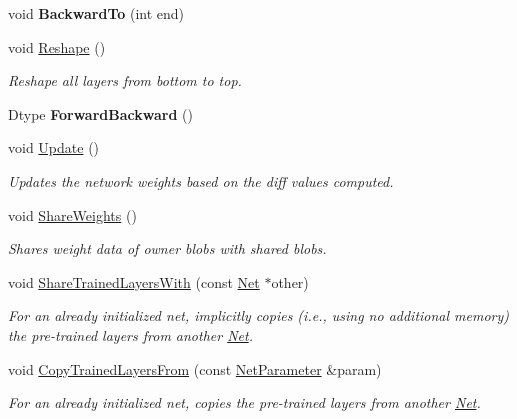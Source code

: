 \begin{DoxyCompactItemize}
void {\bfseries Backward\+To} (int end)
\item 
void \mbox{\hyperlink{classcaffe_1_1_net_a8417af82aa83be45d39aab735bdead1d}{Reshape}} ()
\begin{DoxyCompactList}\small\item\em Reshape all layers from bottom to top. \end{DoxyCompactList}\item 
\mbox{\label{classcaffe_1_1_net_a3ff72974f0f1ba2edc2cb0f76fd41b56}} 
Dtype {\bfseries Forward\+Backward} ()
\item 
\mbox{\label{classcaffe_1_1_net_a8a2544cefc59d6cbe1bf634f5d5be1c5}} 
void \mbox{\hyperlink{classcaffe_1_1_net_a8a2544cefc59d6cbe1bf634f5d5be1c5}{Update}} ()
\begin{DoxyCompactList}\small\item\em Updates the network weights based on the diff values computed. \end{DoxyCompactList}\item 
void \mbox{\hyperlink{classcaffe_1_1_net_a4850fdb3eea1b04c97642546c0dcccf7}{Share\+Weights}} ()
\begin{DoxyCompactList}\small\item\em Shares weight data of owner blobs with shared blobs. \end{DoxyCompactList}\item 
\mbox{\label{classcaffe_1_1_net_a3661ca5f30bf8e731cb54cfc3c320023}} 
void \mbox{\hyperlink{classcaffe_1_1_net_a3661ca5f30bf8e731cb54cfc3c320023}{Share\+Trained\+Layers\+With}} (const \mbox{\hyperlink{classcaffe_1_1_net}{Net}} $\ast$other)
\begin{DoxyCompactList}\small\item\em For an already initialized net, implicitly copies (i.\+e., using no additional memory) the pre-\/trained layers from another \mbox{\hyperlink{classcaffe_1_1_net}{Net}}. \end{DoxyCompactList}\item 
\mbox{\label{classcaffe_1_1_net_a4ac2b69748470f54d530bc5dfa05b9c3}} 
void \mbox{\hyperlink{classcaffe_1_1_net_a4ac2b69748470f54d530bc5dfa05b9c3}{Copy\+Trained\+Layers\+From}} (const \mbox{\hyperlink{classcaffe_1_1_net_parameter}{Net\+Parameter}} \&param)
\begin{DoxyCompactList}\small\item\em For an already initialized net, copies the pre-\/trained layers from another \mbox{\hyperlink{classcaffe_1_1_net}{Net}}. \end{DoxyCompactList}\item 

\end{DoxyCompactItemize}
